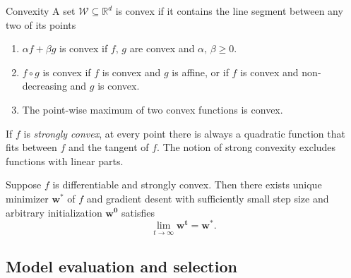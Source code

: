 \documentclass[a4paper,11pt]{article}
\def\R{\mathbb{R}}
\begin{document}
\begin{mainbox}{Convexity}
    A set \( \mathcal{W} \subseteq \R^d \) is convex if it contains the line segment between any two of its points
\end{mainbox}
\begin{enumerate}
    \item \( \alpha f + \beta g \) is convex if \( f, \, g \) are convex and \( \alpha, \, \beta \geq 0 \).
    \item \( f \circ g \) is convex if \( f \) is convex and \( g \) is affine, or if \( f \) is convex and non-decreasing and \( g \) is convex.
    \item The point-wise maximum of two convex functions is convex.
\end{enumerate}

If \( f \) is \emph{strongly convex}, at every point there is always a quadratic function that fits between \( f \) and the tangent of \( f \).
The notion of strong convexity excludes functions with linear parts.

\begin{subbox}{}
    Suppose \( f \) is differentiable and strongly convex. Then there exists unique minimizer \( \mathbf{w^*} \) of \( f \) and gradient desent with sufficiently small step size and arbitrary initialization \( \mathbf{w^0} \) satisfies \[
        \lim_{t \to \infty} \mathbf{w^t} = \mathbf{w^*} \text{.}
    \]
\end{subbox}


\subsection*{Model evaluation and selection}
\end{document}
